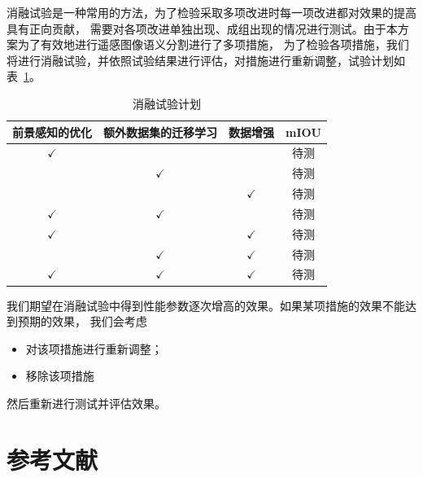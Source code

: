\documentclass[a4paper,twoside,zihao=5,UTF8]{ctexrep}
\begin{document}
消融试验是一种常用的方法，为了检验采取多项改进时每一项改进都对效果的提高具有正向贡献，
需要对各项改进单独出现、成组出现的情况进行测试。由于本方案为了有效地进行遥感图像语义分割进行了多项措施，
为了检验各项措施，我们将进行消融试验，并依照试验结果进行评估，对措施进行重新调整，试验计划如表~\ref{tbl:ablexpr}。

\begin{table}[htbp]
    \centering
    \caption{消融试验计划}
    \label{tbl:ablexpr}
    \renewcommand\arraystretch{1.5}
    \begin{tabular}{ccc|c}
        \toprule
        \hline
        前景感知的优化 & 额外数据集的迁移学习 & 数据增强 & mIOU\\
        \hline
        $\checkmark$ & \ & \ & 待测 \\
        \ & $\checkmark$ & \ & 待测  \\
        \ & \ & $\checkmark$ & 待测  \\
        $\checkmark$ & $\checkmark$ & \ & 待测  \\
        $\checkmark$ & \ & $\checkmark$ & 待测  \\
        \ & $\checkmark$ & $\checkmark$ & 待测  \\
        $\checkmark$ & $\checkmark$ & $\checkmark$ & 待测 \\
        \hline
        \bottomrule
    \end{tabular}
\end{table}

我们期望在消融试验中得到性能参数逐次增高的效果。如果某项措施的效果不能达到预期的效果，
我们会考虑
\begin{itemize}
    \item 对该项措施进行重新调整；
    \item 移除该项措施
\end{itemize}
然后重新进行测试并评估效果。

\part*{参考文献}



\end{document}
